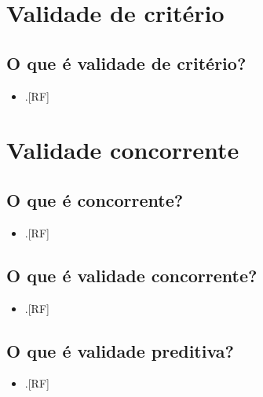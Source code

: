 \documentclass[
  a4paper,
]{book}
\providecommand{\tightlist}{%
  \setlength{\itemsep}{0pt}\setlength{\parskip}{0pt}}
\begin{document}
\hypertarget{validade-criterio}{%
\section{Validade de critério}\label{validade-criterio}}

\hypertarget{o-que-uxe9-validade-de-crituxe9rio}{%
\subsection{O que é validade de critério?}\label{o-que-uxe9-validade-de-crituxe9rio}}

\begin{itemize}
\tightlist
\item
  .{[}RF{]}
\end{itemize}

\hypertarget{validade-concorrente}{%
\section{Validade concorrente}\label{validade-concorrente}}

\hypertarget{o-que-uxe9-concorrente}{%
\subsection{O que é concorrente?}\label{o-que-uxe9-concorrente}}

\begin{itemize}
\tightlist
\item
  .{[}RF{]}
\end{itemize}

\hypertarget{o-que-uxe9-validade-concorrente}{%
\subsection{O que é validade concorrente?}\label{o-que-uxe9-validade-concorrente}}

\begin{itemize}
\tightlist
\item
  .{[}RF{]}
\end{itemize}

\hypertarget{o-que-uxe9-validade-preditiva}{%
\subsection{O que é validade preditiva?}\label{o-que-uxe9-validade-preditiva}}

\begin{itemize}
\tightlist
\item
  .{[}RF{]}
\end{itemize}
\end{document}
